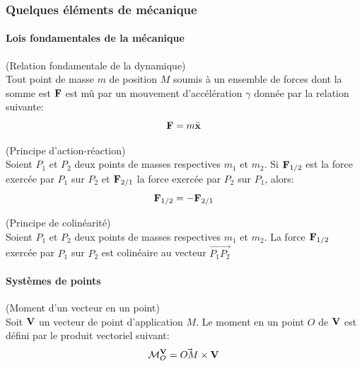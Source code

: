 \subsubsection{Quelques éléments de mécanique}
\paragraph{Lois fondamentales de la mécanique}

\begin{mydef}(Relation fondamentale de la dynamique)\\
  Tout point de masse $m$ de position $M$ soumis à un ensemble de
  forces dont la somme est $\vect{F}$ est mû par un mouvement
  d'accélération $\gamma$ donnée par la relation suivante:
  \begin{equation}\label{eq:newton}
    \vect{F} = m \ddot{\vect{x}}
  \end{equation}
\end{mydef}

\begin{mydef}(Principe d'action-réaction)\\
  Soient $P_1$ et $P_2$ deux points de masses respectives $m_1$ et
  $m_2$. Si $\vect{F}_{1/2}$ est la force exercée par $P_1$ sur $P_2$ et
  $\vect{F}_{2/1}$ la force exercée par $P_2$ sur $P_1$, alors:
  \begin{equation}\label{eq:reaction}
    \vect{F}_{1/2} = -\vect{F}_{2/1}
  \end{equation}
\end{mydef}

\begin{mydef}(Principe de colinéarité)\\
  Soient $P_1$ et $P_2$ deux
  points de masses respectives $m_1$ et $m_2$. La force $\vect{F}_{1/2}$
  exercée par $P_1$ sur $P_2$ est colinéaire au vecteur $\vec{P_1P_2}$
\end{mydef}

\paragraph{Systèmes de points}

\begin{mydef}(Moment d'un vecteur en un point)\\
  Soit $\vect{V}$ un vecteur de point d'application $M$. Le moment en
  un point $O$ de $\vect{V}$ est défini par le produit vectoriel
  suivant:
  $$
  \moment{\vect{V}}{O} = \vec{OM} \crossprod \vect{V}
  $$
\end{mydef}

